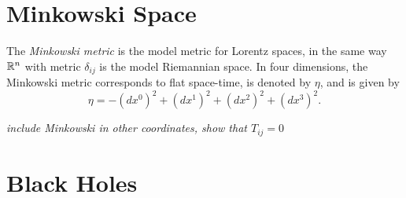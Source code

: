 \section{Minkowski Space}\label{sec:Minkowski}
 The \textit{Minkowski metric} is the model metric for Lorentz spaces, in the same way ${\mathbb R}^n$ with metric $\delta_{ij}$ is the model Riemannian space. In four dimensions, the Minkowski metric corresponds to flat space-time, is denoted by $\eta$, and is given by
\begin{equation} \eta = -(d x^0)^2 + (d x^1)^2 + (d x^2)^2 + (d x^3)^2 .\label{eq:MinkMetric} \end{equation}

\emph{include Minkowski in other coordinates, show that $T_{ij}=0$}


\section{Black Holes}

